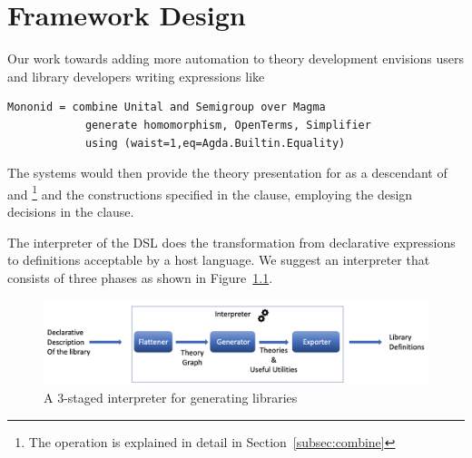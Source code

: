 \chapter{Framework Design}

Our work towards adding more automation to theory development envisions users and library developers writing expressions like 
\begin{lstlisting}
Mononid = combine Unital and Semigroup over Magma
            generate homomorphism, OpenTerms, Simplifier
            using (waist=1,eq=Agda.Builtin.Equality)
\end{lstlisting}
The systems would then provide the theory presentation for  as a descendant of  and \footnote{The  operation is explained in detail in Section~\ref{subsec:combine}} and
the constructions specified in the  clause, employing the design decisions in the  clause.  

The interpreter of the DSL does the transformation from declarative expressions to definitions acceptable by a host language. We suggest an interpreter that consists of three phases as shown in Figure~\ref{fig:staged-interpreter}. 
\begin{figure}
\includegraphics[scale=0.5,width=\linewidth]{figures/interpreter_detailed}
\caption{A $3$-staged interpreter for generating libraries}
\label{fig:staged-interpreter}
\end{figure}

